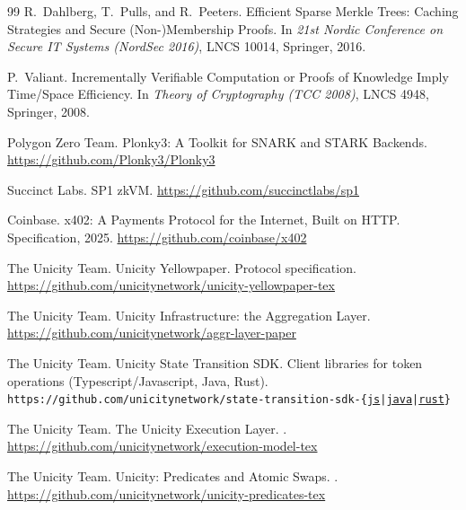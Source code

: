 \begin{thebibliography}{99}
R.~Dahlberg, T.~Pulls, and R.~Peeters.
\newblock Efficient Sparse Merkle Trees: Caching Strategies and Secure (Non-)Membership Proofs.
\newblock In \emph{21st Nordic Conference on Secure IT Systems (NordSec 2016)}, LNCS 10014, Springer, 2016.

P.~Valiant.
\newblock Incrementally Verifiable Computation or Proofs of Knowledge Imply Time/Space Efficiency.
\newblock In \emph{Theory of Cryptography (TCC 2008)}, LNCS 4948, Springer, 2008.

Polygon Zero Team.
\newblock Plonky3: A Toolkit for SNARK and STARK Backends.
\newblock \url{https://github.com/Plonky3/Plonky3}

Succinct Labs.
\newblock SP1 zkVM.
\newblock \url{https://github.com/succinctlabs/sp1}

Coinbase.
\newblock x402: A Payments Protocol for the Internet, Built on HTTP.
\newblock Specification, 2025. \url{https://github.com/coinbase/x402}

The Unicity Team.
\newblock Unicity Yellowpaper.
\newblock Protocol specification. \\ \url{https://github.com/unicitynetwork/unicity-yellowpaper-tex}

The Unicity Team.
\newblock Unicity Infrastructure: the Aggregation Layer.
\newblock \\ \url{https://github.com/unicitynetwork/aggr-layer-paper}

The Unicity Team.
\newblock Unicity State Transition SDK.
\newblock Client libraries for token operations (Typescript/Javascript, Java, Rust).\\ \texttt{https://github.com/unicitynetwork/state-transition-sdk-\{\;\href{https://github.com/unicitynetwork/state-transition-sdk-js}{js}\;|\;\href{https://github.com/unicitynetwork/state-transition-sdk-java}{java}\;|\;\href{https://github.com/unicitynetwork/state-transition-sdk-rust}{rust}\;\}}

The Unicity Team.
\newblock The Unicity Execution Layer.
. \\ \url{https://github.com/unicitynetwork/execution-model-tex}

The Unicity Team.
\newblock Unicity: Predicates and Atomic Swaps.
. \\ \url{https://github.com/unicitynetwork/unicity-predicates-tex}

\end{thebibliography}
